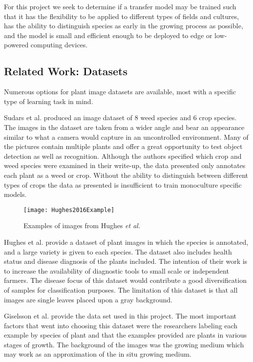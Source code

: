 \documentclass[]{article}
\begin{document}
For this project we seek to determine if a transfer model may be trained such that 
it has the flexibility to be applied to different types of fields and cultures, 
has the ability to distinguish species as early in the growing process as possible, and the model is small and efficient enough to be deployed to edge or low-powered computing devices.

\subsection{Related Work: Datasets}

Numerous options for plant image datasets are available, most with a specific type of learning task in mind.

Sudars et al. \cite{Sudars2020} 
produced an image dataset of 8 weed species and 6 crop species. 
The images in the dataset are taken from a wider angle and bear an appearance similar to what a camera would capture in an uncontrolled environment. 
Many of the pictures contain multiple plants and offer a great opportunity to test object detection as well as recognition. 
Although the authors specified which crop and weed species were examined in their write-up, the data presented only annotates each plant as a weed or crop. 
Without the ability to distinguish between different types of crops the data as presented is insufficient to train monoculture specific models.

\begin{wrapfigure}{r}{0.5\textwidth}
	\begin{center}
		\texttt{[image: Hughes2016Example]}
	\end{center}
	\caption{Examples of images from Hughes \emph{et al.}\cite{Hughes2016}}
\end{wrapfigure}
Hughes et al. \cite{Hughes2016}
provide a dataset of plant images in which the species is annotated, and a large variety is given to each species. 
The dataset also includes health status and disease diagnosis of the plants included.
The intention of their work is to increase the availability of diagnostic tools to small scale or independent farmers.
The disease focus of this dataset would contribute a good diversification of samples for classification purposes.
The limitation of this dataset is that all images are single leaves placed upon a gray background.

Giselsson et al. \cite{Giselsson2017}
provide the data set used in this project.
The most important factors that went into choosing this dataset were the researchers labeling each example by species of plant and that the examples provided are plants in various stages of growth. 
The background of the images was the growing medium which may work as an approximation of the in situ growing medium.
\end{document}
